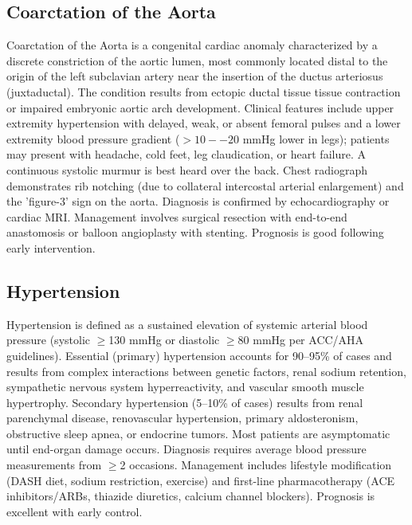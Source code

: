 \subsection{Coarctation of the Aorta}
\label{sec:Coarctation of the Aorta}
Coarctation of the Aorta is a congenital cardiac anomaly characterized by a discrete constriction of the aortic lumen, most commonly located distal to the origin of the left subclavian artery near the insertion of the ductus arteriosus (juxtaductal). The condition results from ectopic ductal tissue tissue contraction or impaired embryonic aortic arch development. Clinical features include upper extremity hypertension with delayed, weak, or absent femoral pulses and a lower extremity blood pressure gradient ($>10--20$ mmHg lower in legs); patients may present with headache, cold feet, leg claudication, or heart failure. A continuous systolic murmur is best heard over the back. Chest radiograph demonstrates rib notching (due to collateral intercostal arterial enlargement) and the 'figure-3' sign on the aorta. Diagnosis is confirmed by echocardiography or cardiac MRI. Management involves surgical resection with end-to-end anastomosis or balloon angioplasty with stenting. Prognosis is good following early intervention.

\subsection{Hypertension}
\label{sec:Hypertension}
Hypertension is defined as a sustained elevation of systemic arterial blood pressure (systolic $\ge$130 mmHg or diastolic $\ge$80 mmHg per ACC/AHA guidelines). Essential (primary) hypertension accounts for 90--95\% of cases and results from complex interactions between genetic factors, renal sodium retention, sympathetic nervous system hyperreactivity, and vascular smooth muscle hypertrophy. Secondary hypertension (5--10\% of cases) results from renal parenchymal disease, renovascular hypertension, primary aldosteronism, obstructive sleep apnea, or endocrine tumors. Most patients are asymptomatic until end-organ damage occurs. Diagnosis requires average blood pressure measurements from $\ge$2 occasions. Management includes lifestyle modification (DASH diet, sodium restriction, exercise) and first-line pharmacotherapy (ACE inhibitors/ARBs, thiazide diuretics, calcium channel blockers). Prognosis is excellent with early control.

